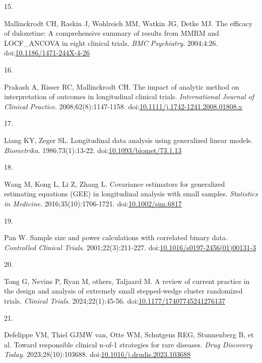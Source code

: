 \documentclass[
  11pt,
]{article}
\newlength{\cslhangindent}
\newlength{\csllabelwidth}
\newenvironment{CSLReferences}[2] %
 {\begin{list}{}{%
  \setlength{\itemindent}{0pt}
  \setlength{\leftmargin}{0pt}
  \setlength{\parsep}{0pt}
  \ifodd #1
   \setlength{\leftmargin}{\cslhangindent}
   \setlength{\itemindent}{-1\cslhangindent}
  \fi
  \setlength{\itemsep}{#2\baselineskip}}}
 {\end{list}}
\newcommand{\CSLLeftMargin}[1]{\parbox[t]{\csllabelwidth}{\strut#1\strut}}
\newcommand{\CSLRightInline}[1]{\parbox[t]{\linewidth - \csllabelwidth}{\strut#1\strut}}
\begin{document}
\begin{CSLReferences}{0}{1}
\CSLLeftMargin{15. }%
\CSLRightInline{Mallinckrodt CH, Raskin J, Wohlreich MM, Watkin JG, Detke MJ. The efficacy of duloxetine: A comprehensive summary of results from {MMRM} and {LOCF\_ANCOVA} in eight clinical trials. \emph{BMC Psychiatry}. 2004;4:26. doi:\href{https://doi.org/10.1186/1471-244X-4-26}{10.1186/1471-244X-4-26}}

\CSLLeftMargin{16. }%
\CSLRightInline{Prakash A, Risser RC, Mallinckrodt CH. The impact of analytic method on interpretation of outcomes in longitudinal clinical trials. \emph{International Journal of Clinical Practice}. 2008;62(8):1147-1158. doi:\href{https://doi.org/10.1111/j.1742-1241.2008.01808.x}{10.1111/j.1742-1241.2008.01808.x}}

\CSLLeftMargin{17. }%
\CSLRightInline{Liang KY, Zeger SL. Longitudinal data analysis using generalized linear models. \emph{Biometrika}. 1986;73(1):13-22. doi:\href{https://doi.org/10.1093/biomet/73.1.13}{10.1093/biomet/73.1.13}}

\CSLLeftMargin{18. }%
\CSLRightInline{Wang M, Kong L, Li Z, Zhang L. Covariance estimators for generalized estimating equations ({GEE}) in longitudinal analysis with small samples. \emph{Statistics in Medicine}. 2016;35(10):1706-1721. doi:\href{https://doi.org/10.1002/sim.6817}{10.1002/sim.6817}}

\CSLLeftMargin{19. }%
\CSLRightInline{Pan W. Sample size and power calculations with correlated binary data. \emph{Controlled Clinical Trials}. 2001;22(3):211-227. doi:\href{https://doi.org/10.1016/s0197-2456(01)00131-3}{10.1016/s0197-2456(01)00131-3}}

\CSLLeftMargin{20. }%
\CSLRightInline{{Tong G, Nevins P, Ryan M, others, Taljaard M}. A review of current practice in the design and analysis of extremely small stepped-wedge cluster randomized trials. \emph{Clinical Trials}. 2024;22(1):45-56. doi:\href{https://doi.org/10.1177/17407745241276137}{10.1177/17407745241276137}}

\CSLLeftMargin{21. }%
\CSLRightInline{{Defelippe VM, Thiel GJMW van, Otte WM, Schutgens REG, Stunnenberg B, et al.} Toward responsible clinical {n}-of-1 strategies for rare diseases. \emph{Drug Discovery Today}. 2023;28(10):103688. doi:\href{https://doi.org/10.1016/j.drudis.2023.103688}{10.1016/j.drudis.2023.103688}}


\end{CSLReferences}
\end{document}
